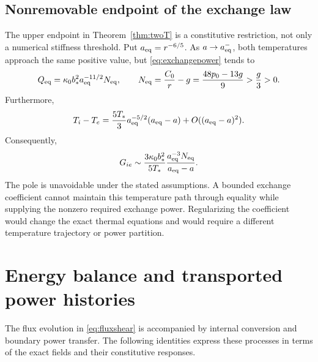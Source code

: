\documentclass[11pt,a4paper]{article}
\theoremstyle{remark}\newtheorem{remark}{Remark}
\numberwithin{equation}{section}
\begin{document}
\subsection{Nonremovable endpoint of the exchange law}
The upper endpoint in Theorem~\ref{thm:twoT} is a constitutive restriction, not only a numerical stiffness threshold. Put $a_{\rm eq}=r^{-6/5}$. As $a\to a_{\rm eq}^{-}$, both temperatures approach the same positive value, but \eqref{eq:exchangepower} tends to
\begin{equation}
Q_{\rm eq}=\kappa_0b_*^2a_{\rm eq}^{-11/2}N_{\rm eq},\qquad
N_{\rm eq}=\frac{C_0}{r}-g=\frac{48p_0-13g}{9}>\frac g3>0.
\label{eq:Qendpoint}
\end{equation}
Furthermore,
\begin{equation}
T_i-T_e=\frac{5T_*}{3}a_{\rm eq}^{-5/2}(a_{\rm eq}-a)
+O((a_{\rm eq}-a)^2).
\label{eq:Tendpoint}
\end{equation}
Consequently,
\begin{equation}
G_{ie}\sim\frac{3\kappa_0b_*^2}{5T_*}
\frac{a_{\rm eq}^{-3}N_{\rm eq}}{a_{\rm eq}-a}.
\label{eq:Gpole}
\end{equation}
The pole is unavoidable under the stated assumptions. A bounded exchange coefficient cannot maintain this temperature path through equality while supplying the nonzero required exchange power. Regularizing the coefficient would change the exact thermal equations and would require a different temperature trajectory or power partition.


\section{Energy balance and transported power histories}\label{sec:energy}
The flux evolution in \eqref{eq:fluxshear} is accompanied by internal conversion and boundary power transfer. The following identities express these processes in terms of the exact fields and their constitutive responses.
\end{document}

